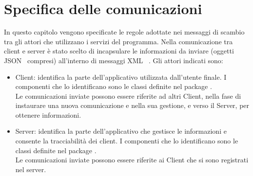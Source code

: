\appendix
\appendixpage
\addappheadtotoc
\section{Specifica delle comunicazioni}
\label{par:XMLComm}

%
%

	{
In questo capitolo vengono specificate le regole adottate nei messaggi di scambio tra gli attori che utilizzano i servizi del programma. Nella comunicazione tra client e server è stato scelto di incapsulare le informazioni da inviare (oggetti JSON\g~ compresi) all’interno di messaggi XML\g~ .
Gli attori indicati sono:
\begin{itemize}
	\item[]{ Client: identifica la parte dell'applicativo utilizzata dall'utente finale. I componenti che lo identificano sono le classi definite nel package .\\
	Le comunicazioni inviate possono essere riferite ad altri Client, nella fase di instaurare una nuova comunicazione e nella sua gestione, e verso il Server, per ottenere informazioni.
	}
	\item[]{ Server: identifica la parte dell'applicativo che gestisce le informazioni e consente la tracciabilità dei client. I componenti che lo identificano sono le classi definite nel package .\\
	Le comunicazioni inviate possono essere riferite ai Client che si sono registrati nel server.
	}
\end{itemize}
	}

